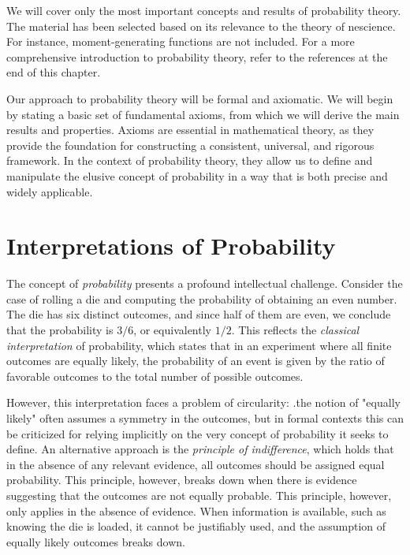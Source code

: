 We will cover only the most important concepts and results of probability theory. The material has been selected based on its relevance to the theory of nescience. For instance, moment-generating functions are not included. For a more comprehensive introduction to probability theory, refer to the references at the end of this chapter.

Our approach to probability theory will be formal and axiomatic. We will begin by stating a basic set of fundamental axioms, from which we will derive the main results and properties. Axioms are essential in mathematical theory, as they provide the foundation for constructing a consistent, universal, and rigorous framework. In the context of probability theory, they allow us to define and manipulate the elusive concept of probability in a way that is both precise and widely applicable.

%
%

\section{Interpretations of Probability}

The concept of \emph{probability} presents a profound intellectual challenge. Consider the case of rolling a die and computing the probability of obtaining an even number. The die has six distinct outcomes, and since half of them are even, we conclude that the probability is $3/6$, or equivalently $1/2$. This reflects the \emph{classical interpretation} of probability, which states that in an experiment where all finite outcomes are equally likely, the probability of an event is given by the ratio of favorable outcomes to the total number of possible outcomes.

However, this interpretation faces a problem of circularity: .the notion of "equally likely" often assumes a symmetry in the outcomes, but in formal contexts this can be criticized for relying implicitly on the very concept of probability it seeks to define. An alternative approach is the \emph{principle of indifference}, which holds that in the absence of any relevant evidence, all outcomes should be assigned equal probability. This principle, however, breaks down when there is evidence suggesting that the outcomes are not equally probable. This principle, however, only applies in the absence of evidence. When information is available, such as knowing the die is loaded, it cannot be justifiably used, and the assumption of equally likely outcomes breaks down.

